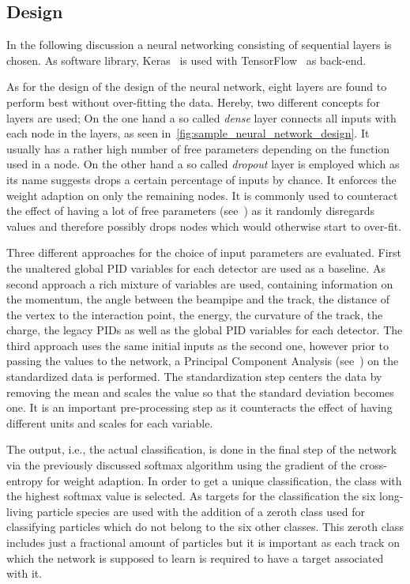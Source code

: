 \subsection{Design}
\label{subsec:neural_network_design}

In the following discussion a neural networking consisting of sequential layers is chosen. As software library, Keras~\cite{chollet2015keras} is used with TensorFlow~\cite{tensorflow2015-whitepaper} as back-end.

As for the design of the design of the neural network, eight layers are found to perform best without over-fitting the data. Hereby, two different concepts for layers are used; On the one hand a so called \textit{dense} layer connects all inputs with each node in the layers, as seen in~\autoref{fig:sample_neural_network_design}. It usually has a rather high number of free parameters depending on the function used in a node. On the other hand a so called \textit{dropout} layer is employed which as its name suggests drops a certain percentage of inputs by chance. It enforces the weight adaption on only the remaining nodes. It is commonly used to counteract the effect of having a lot of free parameters (see~\cite{MachineLearning:DeepLearning}) as it randomly disregards values and therefore possibly drops nodes which would otherwise start to over-fit.

Three different approaches for the choice of input parameters are evaluated. First the unaltered global PID variables for each detector are used as a baseline. As second approach a rich mixture of variables are used, containing information on the momentum, the angle between the beampipe and the track, the distance of the vertex to the interaction point, the energy, the curvature of the track, the charge, the legacy PIDs as well as the global PID variables for each detector. The third approach uses the same initial inputs as the second one, however prior to passing the values to the network, a Principal Component Analysis (see~\cite{BigDataManagementAndAnalytics:TextProcessingAndHigh-DimensionalData}) on the standardized data is performed. The standardization step centers the data by removing the mean and scales the value so that the standard deviation becomes one. It is an important pre-processing step as it counteracts the effect of having different units and scales for each variable.

The output, i.e., the actual classification, is done in the final step of the network via the previously discussed softmax algorithm using the gradient of the cross-entropy for weight adaption. In order to get a unique classification, the class with the highest softmax value is selected. As targets for the classification the six long-living particle species are used with the addition of a zeroth class used for classifying particles which do not belong to the six other classes. This zeroth class includes just a fractional amount of particles but it is important as each track on which the network is supposed to learn is required to have a target associated with it.

